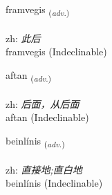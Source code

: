 \documentclass[frontgrid, backgrid]{flacards}\usepackage[]{graphicx}\usepackage[]{color}
\begin{document}
\renewcommand{\blhead}{\vskip5pt {\small\bfseries\footnotesize Atviksorð | 副词 }}
\renewcommand{\bcfoot}{\vskip5pt \hspace{2pt}{\small\bfseries\footnotesize 2K}}


{framvegis \small{\textsubscript{(\textit{adv.})}} \\[1ex]
\textphonetic{[framveijɪs]} \\
zh: \emph{此后} \\  [2ex]
framvegis (Indeclinable)}


\renewcommand{\flhead}{\vskip5pt \fboxsep=0pt {\small\bfseries\footnotesize Atviksorð | 副词}}
\renewcommand{\fcfoot}{\vskip5pt \fboxsep=0pt \hspace{2pt}{\small\bfseries\footnotesize 2K}}

\renewcommand{\blhead}{\vskip5pt {\small\bfseries\footnotesize Atviksorð | 副词 }}
\renewcommand{\bcfoot}{\vskip5pt \hspace{2pt}{\small\bfseries\footnotesize 2K}}


{aftan \small{\textsubscript{(\textit{adv.})}} \\[1ex]
\textphonetic{[aftan]} \\
zh: \emph{后面，从后面} \\  [2ex]
aftan (Indeclinable)}


\renewcommand{\flhead}{\vskip5pt \fboxsep=0pt {\small\bfseries\footnotesize Atviksorð | 副词}}
\renewcommand{\fcfoot}{\vskip5pt \fboxsep=0pt \hspace{2pt}{\small\bfseries\footnotesize 2K}}

\renewcommand{\blhead}{\vskip5pt {\small\bfseries\footnotesize Atviksorð | 副词 }}
\renewcommand{\bcfoot}{\vskip5pt \hspace{2pt}{\small\bfseries\footnotesize 2K}}


{beinlínis \small{\textsubscript{(\textit{adv.})}} \\[1ex]
\textphonetic{[peinlinɪs]} \\
zh: \emph{直接地;直白地} \\  [2ex]
beinlínis (Indeclinable)}
\end{document}
